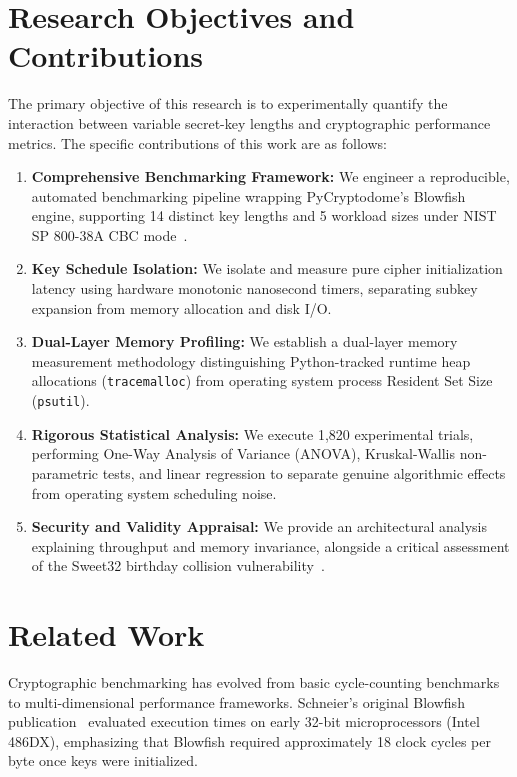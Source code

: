 \documentclass[conference]{IEEEtran}
\begin{document}
\section{Research Objectives and Contributions}
The primary objective of this research is to experimentally quantify the interaction between variable secret-key lengths and cryptographic performance metrics. The specific contributions of this work are as follows:
\begin{enumerate}
    \item \textbf{Comprehensive Benchmarking Framework:} We engineer a reproducible, automated benchmarking pipeline wrapping PyCryptodome's Blowfish engine, supporting 14 distinct key lengths and 5 workload sizes under NIST SP 800-38A CBC mode~\cite{dworkin2001nist}.
    \item \textbf{Key Schedule Isolation:} We isolate and measure pure cipher initialization latency using hardware monotonic nanosecond timers, separating subkey expansion from memory allocation and disk I/O.
    \item \textbf{Dual-Layer Memory Profiling:} We establish a dual-layer memory measurement methodology distinguishing Python-tracked runtime heap allocations (\texttt{tracemalloc}) from operating system process Resident Set Size (\texttt{psutil}).
    \item \textbf{Rigorous Statistical Analysis:} We execute 1,820 experimental trials, performing One-Way Analysis of Variance (ANOVA), Kruskal-Wallis non-parametric tests, and linear regression to separate genuine algorithmic effects from operating system scheduling noise.
    \item \textbf{Security and Validity Appraisal:} We provide an architectural analysis explaining throughput and memory invariance, alongside a critical assessment of the Sweet32 birthday collision vulnerability~\cite{bhargavan2016sweet32}.
\end{enumerate}

\section{Related Work}
Cryptographic benchmarking has evolved from basic cycle-counting benchmarks to multi-dimensional performance frameworks. Schneier's original Blowfish publication~\cite{schneier1993blowfish} evaluated execution times on early 32-bit microprocessors (Intel 486DX), emphasizing that Blowfish required approximately 18 clock cycles per byte once keys were initialized. 
\end{document}
